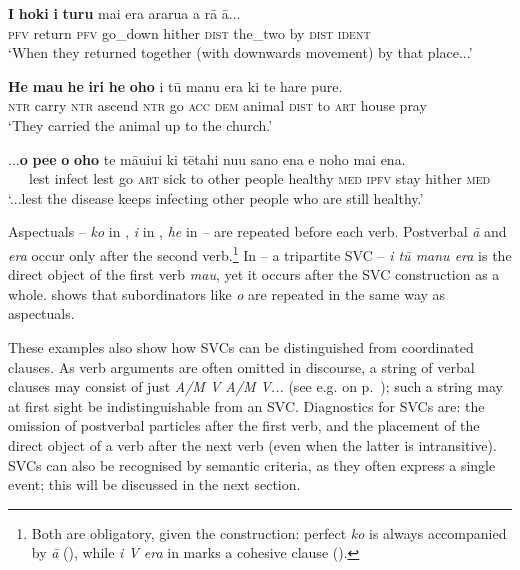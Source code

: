 \ea\label{ex:7.172}
\gll \textbf{I} \textbf{hoki} \textbf{i} \textbf{turu} mai era ararua a rā {\ꞌ}ā... \\
\textsc{pfv} return \textsc{pfv} go\_down hither \textsc{dist} the\_two by \textsc{dist} \textsc{ident} \\

\glt 
‘When they returned together (with downwards movement) by that place...’ \textstyleExampleref{[R245.210]} 
\z

\ea\label{ex:7.173}
\gll \textbf{He} \textbf{ma{\ꞌ}u} \textbf{he} \textbf{iri} \textbf{he} \textbf{oho} i tū manu era ki te hare pure.\\
\textsc{ntr} carry \textsc{ntr} ascend \textsc{ntr} go \textsc{acc} \textsc{dem} animal \textsc{dist} to \textsc{art} house pray\\

\glt 
‘They carried the animal up to the church.’ \textstyleExampleref{[R178.053]} 
\z

\ea\label{ex:7.174}
\gll ...\textbf{{\ꞌ}o} \textbf{pe{\ꞌ}e} \textbf{{\ꞌ}o} \textbf{oho} te māuiui ki tētahi nu{\ꞌ}u sano ena e noho mai ena. \\
~~~lest infect lest go \textsc{art} sick to other people healthy \textsc{med} \textsc{ipfv} stay hither \textsc{med} \\

\glt
‘...lest the disease keeps infecting other people who are still healthy.’ \textstyleExampleref{[R398.017]} 
\z

Aspectuals – \textit{ko} in , \textit{i} in , \textit{he} in  – are repeated before each verb. Postverbal \textit{{\ꞌ}ā}  and \textit{era}  occur only after the second verb.\footnote{\label{fn:375}Both are obligatory, given the construction: perfect \textit{ko} is always accompanied by \textit{{\ꞌ}ā} (), while \textit{i V era} in  marks a cohesive clause ().} In  – a tripartite SVC – \textit{i tū manu era} is the direct object of the first verb \textit{ma{\ꞌ}u}, yet it occurs after the SVC construction as a whole.  shows that subordinators like \textit{{\ꞌ}o} are repeated in the same way as aspectuals. 

These examples also show how SVCs can be distinguished from coordinated clauses. As verb arguments are often omitted in discourse, a string of verbal clauses may consist of just \textit{A/M V A/M V...} (see e.g.  on p.~\pageref{ex:7.3}); such a string may at first sight be indistinguishable from an SVC. Diagnostics for SVCs are: the omission of postverbal particles after the first verb, and the placement of the direct object of a verb after the next verb (even when the latter is intransitive). SVCs can also be recognised by semantic criteria, as they often express a single event; this will be discussed in the next section.

